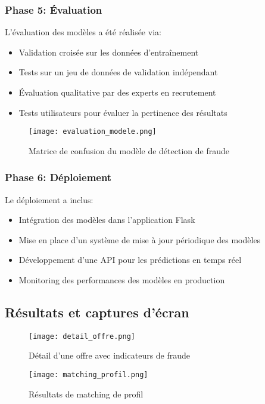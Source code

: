 \documentclass[10pt,a4paper,twocolumn]{article}
\begin{document}
\subsubsection{Phase 5: Évaluation}
L'évaluation des modèles a été réalisée via:
\begin{itemize}
    \item Validation croisée sur les données d'entraînement
    \item Tests sur un jeu de données de validation indépendant
    \item Évaluation qualitative par des experts en recrutement
    \item Tests utilisateurs pour évaluer la pertinence des résultats
\end{itemize}

\begin{figure}[H]
\centering
\texttt{[image: evaluation\_modele.png]}
\caption{Matrice de confusion du modèle de détection de fraude}
\end{figure}

\subsubsection{Phase 6: Déploiement}
Le déploiement a inclus:
\begin{itemize}
    \item Intégration des modèles dans l'application Flask
    \item Mise en place d'un système de mise à jour périodique des modèles
    \item Développement d'une API pour les prédictions en temps réel
    \item Monitoring des performances des modèles en production
\end{itemize}

\subsection{Résultats et captures d'écran}
\begin{figure}[H]
\centering
\texttt{[image: detail\_offre.png]}
\caption{Détail d'une offre avec indicateurs de fraude}
\end{figure}

\begin{figure}[H]
\centering
\texttt{[image: matching\_profil.png]}
\caption{Résultats de matching de profil}
\end{figure}
\end{document}
